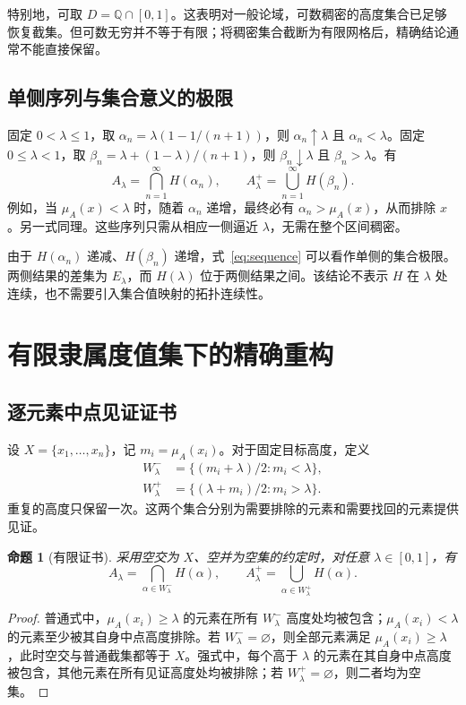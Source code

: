 \documentclass[UTF8,fontset=fandol,zihao=-4,a4paper]{ctexart}
\numberwithin{equation}{section}
\theoremstyle{reportplain}
\newtheorem{proposition}[theorem]{命题}
\newcommand{\muA}{\mu_A}
\newcommand{\cut}[1]{A_{#1}}
\newcommand{\scut}[1]{A_{#1}^{+}}
\newcommand{\set}[1]{\{#1\}}
\newcommand{\eqtag}[1]{\label{#1}}
\begin{document}
特别地，可取 $D=\mathbb Q\cap[0,1]$。这表明对一般论域，可数稠密的高度集合已足够恢复截集。但可数无穷并不等于有限；将稠密集合截断为有限网格后，精确结论通常不能直接保留。

\subsection{单侧序列与集合意义的极限}
固定 $0<\lambda\le1$，取 $\alpha_n=\lambda(1-1/(n+1))$，则 $\alpha_n\uparrow\lambda$ 且 $\alpha_n<\lambda$。固定 $0\le\lambda<1$，取 $\beta_n=\lambda+(1-\lambda)/(n+1)$，则 $\beta_n\downarrow\lambda$ 且 $\beta_n>\lambda$。有
\begin{equation}
\cut{\lambda}=\bigcap_{n=1}^{\infty}H(\alpha_n),
\qquad
\scut{\lambda}=\bigcup_{n=1}^{\infty}H(\beta_n).
\eqtag{eq:sequence}
\end{equation}
例如，当 $\muA(x)<\lambda$ 时，随着 $\alpha_n$ 递增，最终必有 $\alpha_n>\muA(x)$，从而排除 $x$。另一式同理。这些序列只需从相应一侧逼近 $\lambda$，无需在整个区间稠密。

由于 $H(\alpha_n)$ 递减、$H(\beta_n)$ 递增，式~\eqref{eq:sequence} 可以看作单侧的集合极限。两侧结果的差集为 $E_\lambda$，而 $H(\lambda)$ 位于两侧结果之间。该结论不表示 $H$ 在 $\lambda$ 处连续，也不需要引入集合值映射的拓扑连续性。

\section{有限隶属度值集下的精确重构}
\subsection{逐元素中点见证证书}
设 $X=\set{x_1,\ldots,x_n}$，记 $m_i=\muA(x_i)$。对于固定目标高度，定义
\begin{align}
W^-_\lambda&=\set{(m_i+\lambda)/2:m_i<\lambda},\eqtag{eq:wminus}\\
W^+_\lambda&=\set{(\lambda+m_i)/2:m_i>\lambda}.\eqtag{eq:wplus}
\end{align}
重复的高度只保留一次。这两个集合分别为需要排除的元素和需要找回的元素提供见证。

\begin{proposition}[有限证书]
采用空交为 $X$、空并为空集的约定时，对任意 $\lambda\in[0,1]$，有
\begin{equation}
\cut{\lambda}=\bigcap_{\alpha\in W^-_\lambda}H(\alpha),
\qquad
\scut{\lambda}=\bigcup_{\alpha\in W^+_\lambda}H(\alpha).
\eqtag{eq:finite-certificate}
\end{equation}
\end{proposition}
\begin{proof}
普通式中，$\muA(x_i)\ge\lambda$ 的元素在所有 $W^-_\lambda$ 高度处均被包含；$\muA(x_i)<\lambda$ 的元素至少被其自身中点高度排除。若 $W^-_\lambda=\varnothing$，则全部元素满足 $\muA(x_i)\ge\lambda$，此时空交与普通截集都等于 $X$。强式中，每个高于 $\lambda$ 的元素在其自身中点高度被包含，其他元素在所有见证高度处均被排除；若 $W^+_\lambda=\varnothing$，则二者均为空集。\end{proof}
\end{document}
